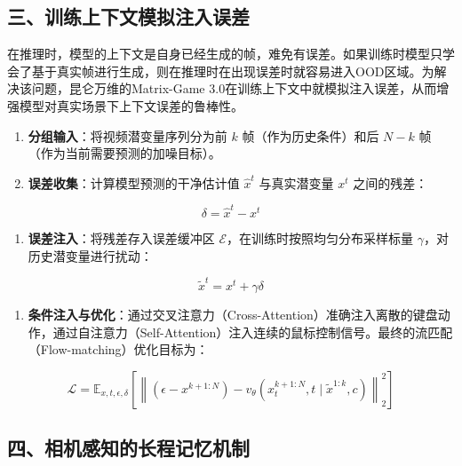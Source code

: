 \hypertarget{ux4e09ux8badux7ec3ux4e0aux4e0bux6587ux6a21ux62dfux6ce8ux5165ux8befux5dee}{%
\subsection{三、训练上下文模拟注入误差}\label{ux4e09ux8badux7ec3ux4e0aux4e0bux6587ux6a21ux62dfux6ce8ux5165ux8befux5dee}}

在推理时，模型的上下文是自身已经生成的帧，难免有误差。如果训练时模型只学会了基于真实帧进行生成，则在推理时在出现误差时就容易进入OOD区域。为解决该问题，昆仑万维的Matrix-Game 3.0在训练上下文中就模拟注入误差，从而增强模型对真实场景下上下文误差的鲁棒性。

\begin{enumerate}
\def\labelenumi{\arabic{enumi}.}
\item
  \textbf{分组输入}：将视频潜变量序列分为前 \(k\) 帧（作为历史条件）和后 \(N-k\) 帧（作为当前需要预测的加噪目标）。
\item
  \textbf{误差收集}：计算模型预测的干净估计值 \(\hat{x}^t\) 与真实潜变量 \(x^t\) 之间的残差：
\end{enumerate}

\[
\delta = \hat{x}^t - x^t
\]

\begin{enumerate}
\def\labelenumi{\arabic{enumi}.}
\setcounter{enumi}{2}
\tightlist
\item
  \textbf{误差注入}：将残差存入误差缓冲区 \(\mathcal{E}\)，在训练时按照均匀分布采样标量 \(\gamma\)，对历史潜变量进行扰动：
\end{enumerate}

\[
\tilde{x}^t = x^t + \gamma\delta
\]

\begin{enumerate}
\def\labelenumi{\arabic{enumi}.}
\setcounter{enumi}{3}
\tightlist
\item
  \textbf{条件注入与优化}：通过交叉注意力（Cross-Attention）准确注入离散的键盘动作，通过自注意力（Self-Attention）注入连续的鼠标控制信号。最终的流匹配（Flow-matching）优化目标为：
\end{enumerate}

\[
\mathcal{L} = \mathbb{E}_{x,t,\epsilon,\delta}\left[\left\|\left(\epsilon - x^{k+1:N}\right) - v_{\theta}\left(x_t^{k+1:N}, t\mid \tilde{x}^{1:k}, c\right)\right\|_2^2\right]
\]

\hypertarget{ux56dbux76f8ux673aux611fux77e5ux7684ux957fux7a0bux8bb0ux5fc6ux673aux5236}{%
\subsection{四、相机感知的长程记忆机制}\label{ux56dbux76f8ux673aux611fux77e5ux7684ux957fux7a0bux8bb0ux5fc6ux673aux5236}}

